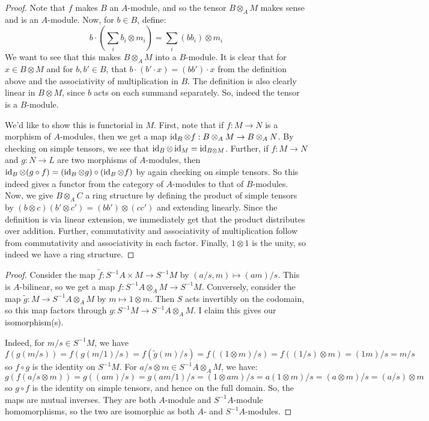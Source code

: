 \documentclass[12pt]{exam}
\begin{document}
\begin{proof}
	Note that $f$ makes $B$ an $A$-module, and so the tensor $B \otimes_A M$ makes sense and is an $A$-module. Now, for $b \in B$, define:
	\[ b \cdot \left(\sum_i b_i \otimes m_i\right) = \sum_i (bb_i) \otimes m_i \]
	We want to see that this makes $B \otimes_A M$ into a $B$-module. It is clear that for $x \in B \otimes M$ and for $b,b' \in B$, that $b \cdot (b' \cdot x) = (bb') \cdot x$ from the definition above and the associativity of multiplication in $B$. The definition is also clearly linear in $B \otimes M$, since $b$ acts on each summand separately. So, indeed the tensor is a $B$-module.
	
	We'd like to show this is functorial in $M$. First, note that if $f : M \to N$ is a morphism of $A$-modules, then we get a map $\operatorname{id}_B \otimes f : B \otimes_A M \to B \otimes_A N$. By checking on simple tensors, we see that $\operatorname{id}_B \otimes \operatorname{id}_M = \operatorname{id}_{B \otimes M}$. Further, if $f : M \to N$ and $g : N \to L$ are two morphisms of $A$-modules, then $\operatorname{id}_B \otimes (g \circ f) = (\operatorname{id}_B \otimes g) \circ (\operatorname{id}_B \otimes f)$ by again checking on simple tensors. So this indeed gives a functor from the category of $A$-modules to that of $B$-modules. \\
	
	Now, we give $B \otimes_A C$ a ring structure by defining the product of simple tensors by $(b \otimes c)(b' \otimes c') = (bb') \otimes (cc')$ and extending linearly. Since the definition is via linear extension, we immediately get that the product distributes over addition. Further, commutativity and associativity of multiplication follow from commutativity and associativity in each factor. Finally, $1 \otimes 1$ is the unity, so indeed we have a ring structure.
\end{proof}

\begin{proof}
	Consider the map $\tilde{f} : S^{-1}A \times M \to S^{-1}M$ by $(a/s,m) \mapsto (am)/s$. This is $A$-bilinear, so we get a map $f : S^{-1}A \otimes_A M \to S^{-1}M$. Conversely, consider the map $\tilde{g} : M \to S^{-1}A \otimes_A M$ by $m \mapsto 1 \otimes m$. Then $S$ acts invertibly on the codomain, so this map factors through $g : S^{-1}M \to S^{-1}A \otimes_A M$. I claim this gives our isomorphism(s).
	
	Indeed, for $m/s \in S^{-1}M$, we have
	\[ f(g(m/s)) = f(g(m/1)/s)= f(\tilde{g}(m)/s) = f((1 \otimes m)/s) = f((1/s) \otimes m) = (1m)/s = m/s \]
	so $f \circ g$ is the identity on $S^{-1}M$. For $a/s \otimes m \in S^{-1}A \otimes_A M$, we have:
	\[ g(f(a/s \otimes m)) = g((am)/s) = g(am/1)/s = (1 \otimes am)/s = a(1 \otimes m)/s = (a \otimes m)/s = (a/s) \otimes m \]
	so $g \circ f$ is the identity on simple tensors, and hence on the full domain. So, the maps are mutual inverses. They are both $A$-module and $S^{-1}A$-module homomorphisms, so the two are isomorphic as both $A$- and $S^{-1}A$-modules.
\end{proof}
\end{document}
